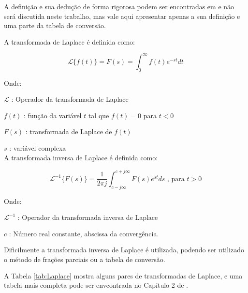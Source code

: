 A definição e sua dedução de forma rigorosa podem ser encontradas em \cite{Ogata} e não será discutida neste trabalho, mas vale aqui apresentar apenas a sua definição e uma parte da tabela de conversão.

A transformada de Laplace é definida como:

\begin{equation}
\mathscr{L}\{f(t)\} = F(s) = \int_{0}^{\infty} f(t) e^{-st} dt
\label{eq:transfLaplace}
\end{equation} 

Onde:

\setlength{\parindent}{2cm}
$\mathscr{L}$ : Operador da transformada de Laplace 

$f(t)$ : função da variável $t$ tal que $f(t) = 0$ para $t < 0$ 

$F(s)$ : transformada de Laplace de $f(t)$

$s$ : variável complexa
\\

\setlength{\parindent}{0cm}
A transformada inversa de Laplace é definida como:

\begin{equation}
\mathscr{L}^{-1} \{F(s)\} =  \frac{1}{2 \pi j} \int_{c-j\infty}^{c+j\infty}F(s) e^{st} ds  \text{ , para } t > 0
\label{eq:transfInvLaplace}
\end{equation}

Onde:

\setlength{\parindent}{2cm}
$\mathscr{L}^{-1}$ : Operador da transformada inversa de Laplace

$c$ : Número real constante, abscissa da convergência.


\setlength{\parindent}{0cm}

Dificilmente a transformada inversa de Laplace é utilizada, podendo ser utilizado o método de frações parciais ou a tabela de conversão.

A Tabela \ref{tab:Laplace} mostra alguns pares de transformadas de Laplace, e uma tabela mais completa pode ser envcontrada no Capítulo 2 de \citet{ogata}. 

